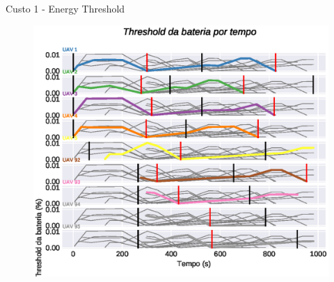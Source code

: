 \begin{frame}{Custo 1 - Energy Threshold}
            \begin{figure}[!htb]
                 \includegraphics[width=\textwidth]{custo_1/uav_energy_threshold_.eps}
             \end{figure}
        \end{frame}